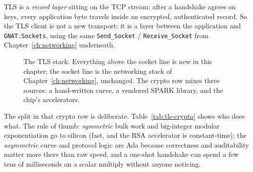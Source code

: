 TLS is a \emph{record layer} sitting on the TCP stream: after a handshake agrees
on keys, every application byte travels inside an encrypted, authenticated record.
So the TLS client is not a new transport: it is a layer between the application
and \texttt{GNAT.Sockets}, using the same \texttt{Send\_Socket} /
\texttt{Receive\_Socket} from Chapter~\ref{ch:networking} underneath.

\begin{figure}[ht]
\centering
{}
\caption{The TLS stack. Everything above the socket line is new in this chapter;
the socket line is the networking stack of Chapter~\ref{ch:networking}, unchanged.
The crypto row mixes three sources: a hand-written curve, a vendored SPARK library,
and the chip's accelerators.}
\label{fig:tls-layers}
\end{figure}

The split in that crypto row is deliberate. Table~\ref{tab:tls-crypto} shows who
does what. The rule of thumb: \emph{symmetric} bulk work and big-integer modular
exponentiation go to silicon (fast, and the RSA accelerator is constant-time);
the \emph{asymmetric} curve and protocol logic are Ada because correctness and
auditability matter more there than raw speed, and a one-shot handshake can spend
a few tens of milliseconds on a scalar multiply without anyone noticing.

